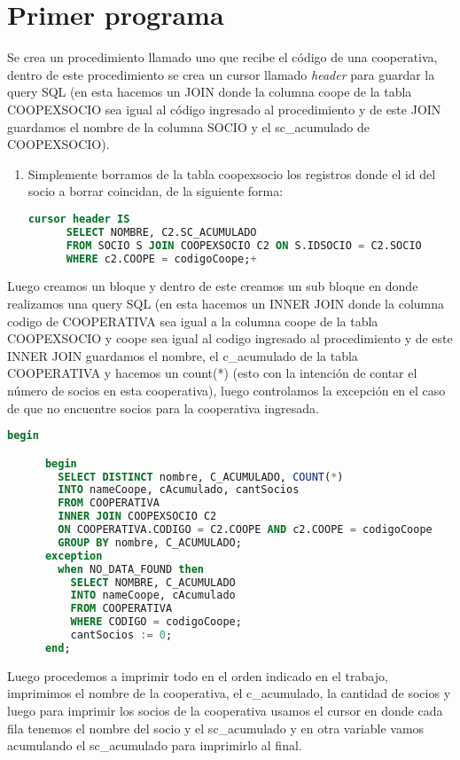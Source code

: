\documentclass{article}
\begin{document}
\section{Primer programa}
Se crea un procedimiento llamado uno que recibe el código de una cooperativa, dentro de este procedimiento se crea un cursor llamado \emph{header} para guardar la query SQL (en esta hacemos un JOIN donde la columna coope de la tabla COOPEXSOCIO sea igual al código ingresado al procedimiento y de este JOIN guardamos el nombre de la columna SOCIO y el sc\_acumulado de COOPEXSOCIO).
\begin{enumerate}
    \item Simplemente borramos de la tabla coopexsocio los registros donde el id del socio a borrar coincidan, de la siguiente forma:
    \begin{lstlisting}[language=SQL]
    cursor header IS
      SELECT NOMBRE, C2.SC_ACUMULADO
      FROM SOCIO S JOIN COOPEXSOCIO C2 ON S.IDSOCIO = C2.SOCIO
      WHERE c2.COOPE = codigoCoope;+\end{lstlisting}
\end{enumerate}
      Luego creamos un bloque y dentro de este creamos un sub bloque en donde realizamos una query SQL (en esta hacemos un INNER JOIN donde la columna codigo de COOPERATIVA sea igual a la columna coope de la tabla COOPEXSOCIO y coope sea igual al codigo ingresado al procedimiento y de este INNER JOIN guardamos el nombre, el c\_acumulado de la tabla COOPERATIVA y hacemos un count(*) (esto con la intención de contar el número de socios en esta cooperativa), luego controlamos la excepción en el caso de que no encuentre socios para la cooperativa ingresada.
    \begin{lstlisting}[language=SQL]
    begin

      begin
        SELECT DISTINCT nombre, C_ACUMULADO, COUNT(*)
        INTO nameCoope, cAcumulado, cantSocios
        FROM COOPERATIVA
        INNER JOIN COOPEXSOCIO C2 
        ON COOPERATIVA.CODIGO = C2.COOPE AND c2.COOPE = codigoCoope
        GROUP BY nombre, C_ACUMULADO;
      exception
        when NO_DATA_FOUND then
          SELECT NOMBRE, C_ACUMULADO
          INTO nameCoope, cAcumulado
          FROM COOPERATIVA
          WHERE CODIGO = codigoCoope;
          cantSocios := 0;
      end;\end{lstlisting}
Luego procedemos a imprimir todo en el orden indicado en el trabajo, imprimimos el nombre de la cooperativa, el c\_acumulado, la cantidad de socios y luego para imprimir los socios de la cooperativa usamos el cursor en donde cada fila tenemos el nombre del socio y el sc\_acumulado y en otra variable vamos acumulando el sc\_acumulado para imprimirlo al final.
\end{document}
